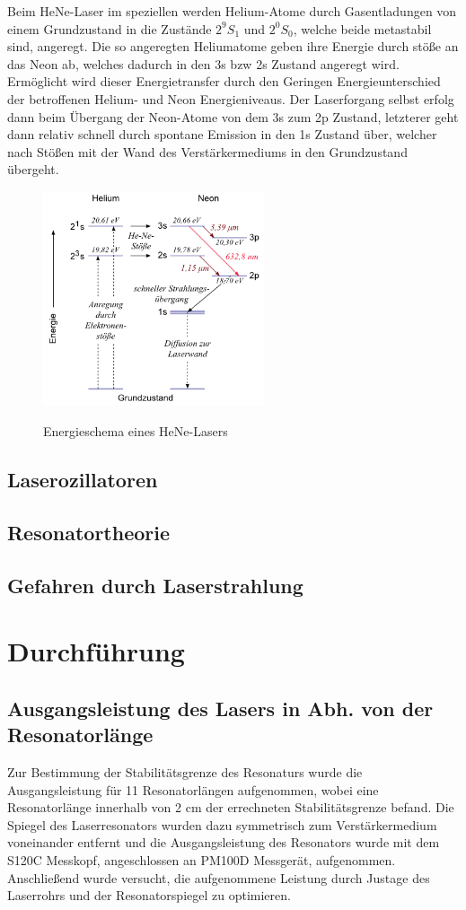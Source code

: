 \documentclass[bigchapter,colorback,accentcolor=tud4b,linedtoc,11pt]{tudreport}
\numberwithin{equation}{subsection}
\begin{document}
Beim HeNe-Laser im speziellen werden Helium-Atome durch Gasentladungen von einem Grundzustand in die Zustände $2^{9}S_{1}$ und $2^{0}S_{0}$, welche beide metastabil sind, angeregt. Die so angeregten Heliumatome geben ihre Energie durch stöße an das Neon ab, welches dadurch in den 3s bzw 2s Zustand angeregt wird. Ermöglicht wird dieser Energietransfer durch den Geringen Energieunterschied der betroffenen Helium- und Neon Energieniveaus. Der Laserforgang selbst erfolg dann beim Übergang der Neon-Atome von dem 3s zum 2p Zustand, letzterer geht dann relativ schnell durch spontane Emission in den 1s Zustand über, welcher nach Stößen mit der Wand des Verstärkermediums in den Grundzustand übergeht.

\begin{figure}[ht!]
\centering
\includegraphics[width=65mm]{img/5074.png}
\caption{Energieschema eines HeNe-Lasers}
\label{HeNeLaser}
\cite{HeNeNiveaus}
\end{figure}
\section{Laserozillatoren}

\section{Resonatortheorie}

\section{Gefahren durch Laserstrahlung}

\chapter{Durchführung}
\section{Ausgangsleistung des Lasers in Abh. von der Resonatorlänge}
Zur Bestimmung der Stabilitätsgrenze des Resonaturs wurde die Ausgangsleistung für 11 Resonatorlängen aufgenommen, wobei eine Resonatorlänge innerhalb von 2 cm der errechneten Stabilitätsgrenze befand.
Die Spiegel des Laserresonators wurden dazu symmetrisch zum Verstärkermedium voneinander entfernt und die Ausgangsleistung des Resonators wurde mit dem S120C Messkopf, angeschlossen an PM100D Messgerät, aufgenommen. Anschließend wurde versucht, die aufgenommene Leistung durch Justage des Laserrohrs und der Resonatorspiegel zu optimieren.
\end{document}
